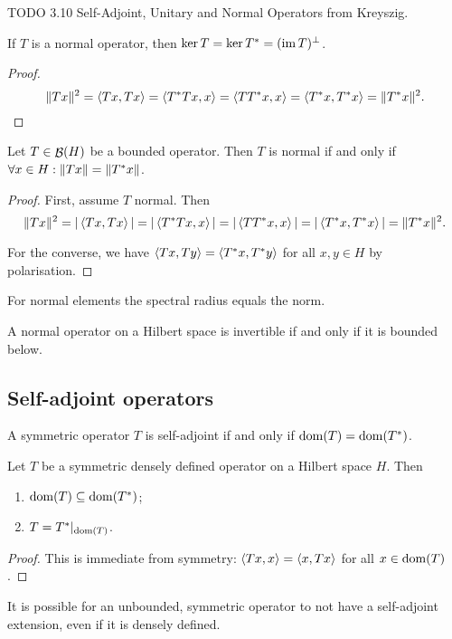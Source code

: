 TODO 3.10 Self-Adjoint, Unitary and Normal Operators from Kreyszig.

\begin{lemma} \label{lemma:equalityKernelAdjointNormal}
If $T$ is a normal operator, then $\ker T = \ker T^* = (\operatorname{im} T)^\perp$.
\end{lemma}
\begin{proof}
\[ \lVert Tx\rVert^2 = \left\langle Tx,Tx \right\rangle = \left\langle T^*Tx, x \right\rangle = \left\langle TT^*x, x \right\rangle = \left\langle T^*x, T^*x \right\rangle = \lVert T^*x\rVert^2. \]
\end{proof}

\begin{proposition}
Let $T\in\mathop{\mathcal{B}}(H)$ be a bounded operator. Then $T$ is normal \textup{if and only if} $\forall x\in H: \lVert Tx\rVert = \lVert T^*x\rVert$.
\end{proposition}
\begin{proof}
First, assume $T$ normal. Then
\[ \lVert Tx\rVert^2 = |\left\langle Tx,Tx \right\rangle| = |\left\langle T^*Tx,x \right\rangle| = |\left\langle TT^*x,x \right\rangle| = |\left\langle T^*x,T^*x \right\rangle| = \lVert T^*x\rVert^2. \]

For the converse, we have $\left\langle Tx, Ty \right\rangle = \left\langle T^*x, T^* y \right\rangle$ for all $x,y\in H$ by polarisation.
\end{proof}

\begin{lemma} \label{lemma:normalSpectralRadiusEqualsNorm}
For normal elements the spectral radius equals the norm.
\end{lemma}

\begin{lemma}
A normal operator on a Hilbert space is invertible \textup{if and only if} it is bounded below.
\end{lemma}

\subsection{Self-adjoint operators}
A symmetric operator $T$ is self-adjoint if and only if $\operatorname{dom}(T) = \operatorname{dom}(T^*)$.
\begin{lemma}
Let $T$ be a symmetric densely defined operator on a Hilbert space $H$. Then
\begin{enumerate}
\item $\operatorname{dom}(T) \subseteq \operatorname{dom}(T^*)$;
\item $T = T^*|_{\operatorname{dom}(T)}$.
\end{enumerate}
\end{lemma}
\begin{proof}
This is immediate from symmetry: $\left\langle Tx,x \right\rangle = \left\langle x,Tx \right\rangle$ for all $x\in\operatorname{dom}(T)$.
\end{proof}
It is possible for an unbounded,
symmetric operator to not have a self-adjoint extension, even if it is densely defined.

